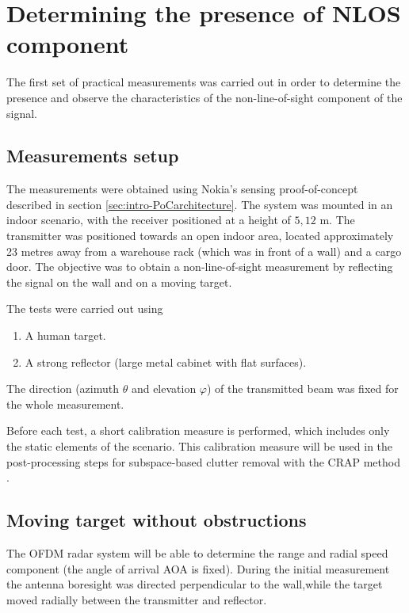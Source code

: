 \chapter{Determining the presence of NLOS component}

The first set of practical measurements was carried out in order to determine the presence and observe the characteristics of the non-line-of-sight component of the signal. 

\section{Measurements setup}

The measurements were obtained using Nokia's sensing proof-of-concept described in section \ref{sec:intro-PoCarchitecture}. The system was mounted in an indoor scenario, with the receiver positioned at a height of $5,12$ m. The transmitter was positioned towards an open indoor area, located approximately 23 metres away from a warehouse rack (which was in front of a wall) and a cargo door.
The objective was to obtain a non-line-of-sight measurement by reflecting the signal on the wall and on a moving target. 

The tests were carried out using

\begin{enumerate}
	\item A human target.
	\item A strong reflector (large metal cabinet with flat surfaces).
\end{enumerate}

The direction (azimuth $\theta$ and elevation $\varphi$) of the transmitted beam was fixed for the whole measurement.

Before each test, a short calibration measure is performed, which includes only the static elements of the scenario. This calibration measure will be used in the post-processing steps for subspace-based clutter removal with the CRAP method  \cite{Henninger_Mandelli_Grudnitsky_Wild_Brink_2023}. 

\section{Moving target without obstructions}

The OFDM radar system will be able to determine the range and radial speed component (the angle of arrival AOA is fixed). During the initial measurement the antenna boresight was directed perpendicular to the wall,while the target moved radially between the transmitter and reflector.

